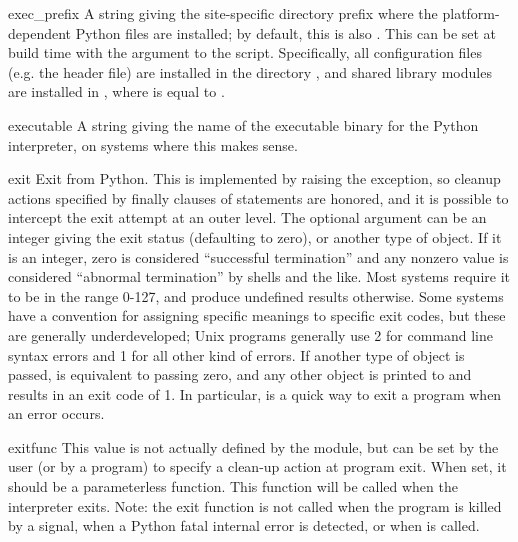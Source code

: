 \begin{datadesc}{exec_prefix}
A string giving the site-specific
directory prefix where the platform-dependent Python files are
installed; by default, this is also .  This can be
set at build time with the \code{-} argument to the
 script.  Specifically, all configuration files
(e.g. the  header file) are installed in the directory
, and shared library
modules are installed in
,
where  is equal to .
\end{datadesc}

\begin{datadesc}{executable}
A string giving the name of the executable binary for the Python
interpreter, on systems where this makes sense.
\end{datadesc}

\begin{funcdesc}{exit}{}
Exit from Python.  This is implemented by raising the
 exception, so cleanup actions specified by
finally clauses of  statements are honored, and it is
possible to intercept the exit attempt at an outer level.  The
optional argument  can be an integer giving the exit status
(defaulting to zero), or another type of object.  If it is an integer,
zero is considered ``successful termination'' and any nonzero value is
considered ``abnormal termination'' by shells and the like.  Most
systems require it to be in the range 0-127, and produce undefined
results otherwise.  Some systems have a convention for assigning
specific meanings to specific exit codes, but these are generally
underdeveloped; Unix programs generally use 2 for command line syntax
errors and 1 for all other kind of errors.  If another type of object
is passed,  is equivalent to passing zero, and any other
object is printed to  and results in an exit code of
1.  In particular,  is a quick
way to exit a program when an error occurs.
\end{funcdesc}

\begin{datadesc}{exitfunc}
  This value is not actually defined by the module, but can be set by
  the user (or by a program) to specify a clean-up action at program
  exit.  When set, it should be a parameterless function.  This function
  will be called when the interpreter exits.  Note: the exit function
  is not called when the program is killed by a signal, when a Python
  fatal internal error is detected, or when  is called.
\end{datadesc}

